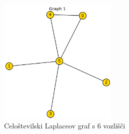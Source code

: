 \documentclass{article}
\begin{document}
\begin{figure}[htbp]
    \centering
    \includegraphics[width=0.5\textwidth]{primer_6.png}
    \caption{Celoštevilski Laplaceov graf s 6 vozlišči}
    \label{fig:izjema2}
\end{figure}
\end{document}
